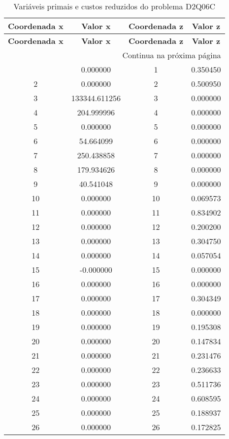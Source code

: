 \documentclass[12pt]{article}
\begin{document}
\begin{longtable}{@{}cccc@{}}
\caption{Variáveis primais e custos reduzidos do problema D2Q06C} \\
\toprule
\textbf{Coordenada x} & \textbf{Valor x} & \textbf{Coordenada z} & \textbf{Valor z} \\
\midrule
\endfirsthead

\toprule
\textbf{Coordenada x} & \textbf{Valor x} & \textbf{Coordenada z} & \textbf{Valor z} \\
\midrule
\endhead

\midrule \multicolumn{4}{r}{{Continua na próxima página}} \\ \midrule
\endfoot

\bottomrule
\endlastfoot
1 & 0.000000 & 1 & 0.350450 \\
2 & 0.000000 & 2 & 0.500950 \\
3 & 133344.611256 & 3 & 0.000000 \\
4 & 204.999996 & 4 & 0.000000 \\
5 & 0.000000 & 5 & 0.000000 \\
6 & 54.664099 & 6 & 0.000000 \\
7 & 250.438858 & 7 & 0.000000 \\
8 & 179.934626 & 8 & 0.000000 \\
9 & 40.541048 & 9 & 0.000000 \\
10 & 0.000000 & 10 & 0.069573 \\
11 & 0.000000 & 11 & 0.834902 \\
12 & 0.000000 & 12 & 0.200200 \\
13 & 0.000000 & 13 & 0.304750 \\
14 & 0.000000 & 14 & 0.057054 \\
15 & -0.000000 & 15 & 0.000000 \\
16 & 0.000000 & 16 & 0.000000 \\
17 & 0.000000 & 17 & 0.304349 \\
18 & 0.000000 & 18 & 0.000000 \\
19 & 0.000000 & 19 & 0.195308 \\
20 & 0.000000 & 20 & 0.147834 \\
21 & 0.000000 & 21 & 0.231476 \\
22 & 0.000000 & 22 & 0.236633 \\
23 & 0.000000 & 23 & 0.511736 \\
24 & 0.000000 & 24 & 0.608595 \\
25 & 0.000000 & 25 & 0.188937 \\
26 & 0.000000 & 26 & 0.172825 \\

\end{longtable}
\end{document}
